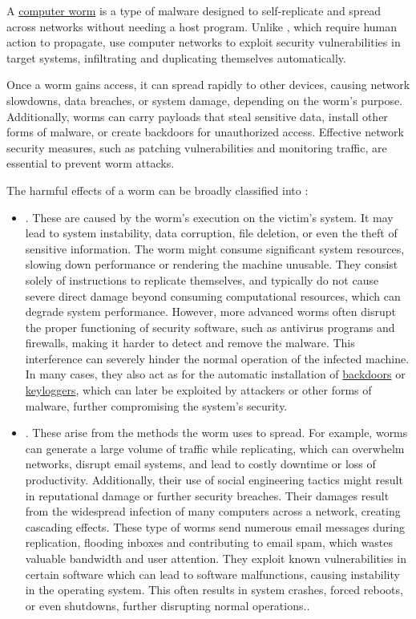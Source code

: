 \documentclass[a4paper, 12pt]{report}
\begin{document}
    A \href{https://en.wikipedia.org/wiki/Computer_worm}{computer worm} is a type of malware designed to self-replicate and spread across networks without needing a host program. Unlike , which require human action to propagate,  use computer networks to exploit security vulnerabilities in target systems, infiltrating and duplicating themselves automatically.

    Once a worm gains access, it can spread rapidly to other devices, causing network slowdowns, data breaches, or system damage, depending on the worm's purpose. Additionally, worms can carry payloads that steal sensitive data, install other forms of malware, or create backdoors for unauthorized access. Effective network security measures, such as patching vulnerabilities and monitoring traffic, are essential to prevent worm attacks.

    The harmful effects of a worm can be broadly classified into :

    \begin{itemize}
        \item {}. These are caused by the worm's execution on the victim's system. It may lead to system instability, data corruption, file deletion, or even the theft of sensitive information. The worm might consume significant system resources, slowing down performance or rendering the machine unusable. They consist solely of instructions to replicate themselves, and typically do not cause severe direct damage beyond consuming computational resources, which can degrade system performance. However, more advanced  worms often disrupt the proper functioning of security software, such as antivirus programs and firewalls, making it harder to detect and remove the malware. This interference can severely hinder the normal operation of the infected machine. In many cases, they also act as  for the automatic installation of \href{https://en.wikipedia.org/wiki/Backdoor_(computing)}{backdoors} or \href{https://en.wikipedia.org/wiki/Keystroke_logging}{keyloggers}, which can later be exploited by attackers or other forms of malware, further compromising the system's security.
        \item {}. These arise from the methods the worm uses to spread. For example, worms can generate a large volume of traffic while replicating, which can overwhelm networks, disrupt email systems, and lead to costly downtime or loss of productivity. Additionally, their use of social engineering tactics might result in reputational damage or further security breaches. Their damages result from the widespread infection of many computers across a network, creating cascading effects. These type of worms send numerous email messages during replication, flooding inboxes and contributing to email spam, which wastes valuable bandwidth and user attention. They exploit known vulnerabilities in certain software which can lead to software malfunctions, causing instability in the operating system. This often results in system crashes, forced reboots, or even shutdowns, further disrupting normal operations..
    \end{itemize}
\end{document}
